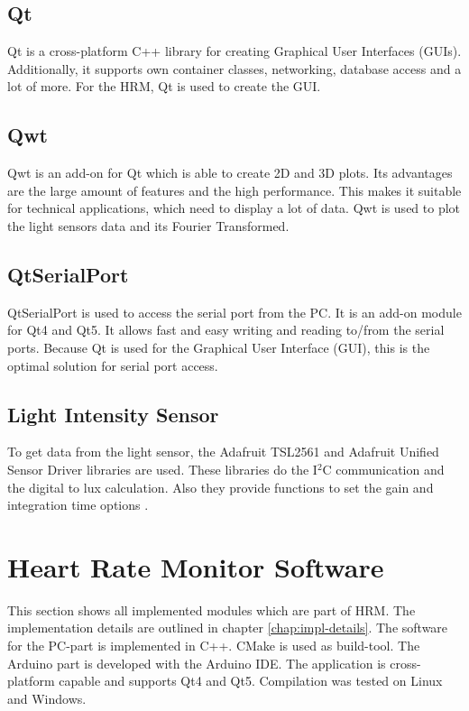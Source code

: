 \documentclass[notitlepage]{scrreprt}
\begin{document}
\subsection{Qt}
Qt is a cross-platform C++ library for creating Graphical User Interfaces (GUIs). Additionally, it supports own container classes, networking, database access and a lot of more. For the HRM, Qt is used to create the GUI.

\subsection{Qwt}
Qwt is an add-on for Qt which is able to create 2D and 3D plots. Its advantages are the large amount of features and the high performance. This makes it suitable for technical applications, which need to display a lot of data. Qwt is used to plot the light sensors data and its Fourier Transformed.

\subsection{QtSerialPort}
QtSerialPort is used to access the serial port from the PC. It is an add-on module for Qt4 and Qt5. It allows fast and easy writing and reading to/from the serial ports. Because Qt is used for the Graphical User Interface (GUI), this is the optimal solution for serial port access.

\subsection{Light Intensity Sensor}
To get data from the light sensor, the Adafruit TSL2561 and Adafruit Unified Sensor Driver libraries are used. These libraries do the I$^{2}$C communication and the digital to lux calculation. Also they provide functions to set the gain and integration time options \cite{bib:tsl-library} \cite{bib:sensor-library}.

\newpage

\section{Heart Rate Monitor Software}
This section shows all implemented modules which are part of HRM. The implementation details are outlined in chapter \ref{chap:impl-details}. The software for the PC-part is implemented in C++. CMake is used as build-tool. The Arduino part is developed with the Arduino IDE. The application is cross-platform capable and supports Qt4 and Qt5. Compilation was tested on Linux and Windows.
\end{document}
